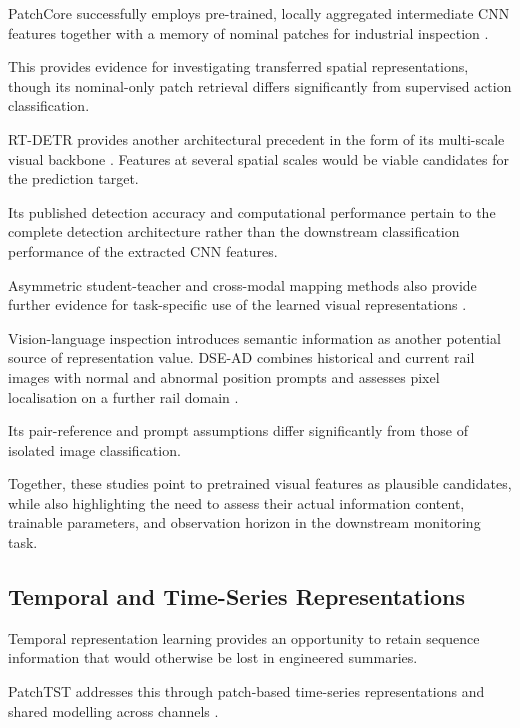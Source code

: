 PatchCore successfully employs pre-trained, locally aggregated intermediate CNN features together
with a memory of nominal patches for industrial inspection \parencite[Section~3]{roth_towards_2022}.

This provides evidence for investigating transferred spatial representations, though its
nominal-only patch retrieval differs significantly from supervised action classification.

RT-DETR provides another architectural precedent in the form of its multi-scale visual backbone
\parencite[Sections~4.1--4.2]{zhao_detrs_2024}. Features at several spatial scales would be viable
candidates for the prediction target.

Its published detection accuracy and computational performance pertain to the complete detection
architecture rather than the downstream classification performance of the extracted CNN features.

Asymmetric student-teacher and cross-modal mapping methods also provide further evidence for
task-specific use of the learned visual representations
\parencite{rudolph_asymmetric_2023,costanzino_multimodal_2024}.

Vision-language inspection introduces semantic information as another potential source of
representation value. DSE-AD combines historical and current rail images with normal and abnormal
position prompts and assesses pixel localisation on a further rail domain \parencite{lei_dual-state-based_2025}.

Its pair-reference and prompt assumptions differ significantly from those of isolated image
classification.

Together, these studies point to pretrained visual features as plausible candidates, while also
highlighting the need to assess their actual information content, trainable parameters, and
observation horizon in the downstream monitoring task.

\subsection{Temporal and Time-Series Representations}

Temporal representation learning provides an opportunity to retain sequence information that would
otherwise be lost in engineered summaries.

PatchTST addresses this through patch-based time-series representations and shared modelling across
channels \parencite[Sections~3.1--3.2]{nie_time_2023}.


